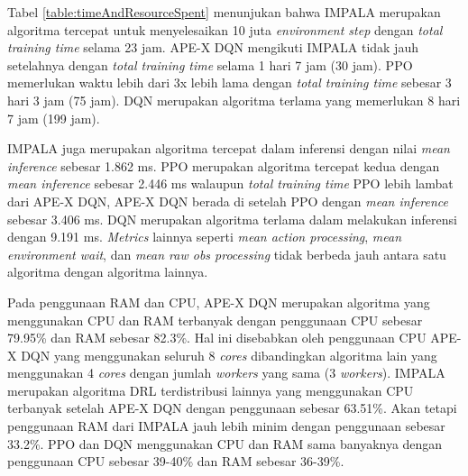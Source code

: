 Tabel \ref{table:timeAndResourceSpent} menunjukan bahwa IMPALA merupakan algoritma tercepat
untuk menyelesaikan 10 juta \emph{environment step} dengan \emph{total training time} selama
23 jam. APE-X DQN mengikuti IMPALA tidak jauh setelahnya dengan \emph{total training time}
selama 1 hari 7 jam (30 jam). PPO memerlukan waktu lebih dari 3x lebih lama dengan \emph{total training time}
sebesar 3 hari 3 jam (75 jam). DQN merupakan algoritma terlama yang memerlukan 8 hari 7 jam (199 jam).

IMPALA juga merupakan algoritma tercepat dalam inferensi dengan nilai \emph{mean inference} sebesar
1.862 ms. PPO merupakan algoritma tercepat kedua dengan \emph{mean inference} sebesar 2.446 ms walaupun \emph{total
training time} PPO lebih lambat dari APE-X DQN, APE-X DQN berada di setelah PPO dengan \emph{mean inference}
sebesar 3.406 ms. DQN merupakan algoritma terlama dalam melakukan inferensi dengan 9.191 ms.
\emph{Metrics} lainnya seperti \emph{mean action processing}, \emph{mean environment wait}, dan \emph{mean raw obs processing}
tidak berbeda jauh antara satu algoritma dengan algoritma lainnya.

Pada penggunaan RAM dan CPU, APE-X DQN merupakan algoritma yang menggunakan CPU dan RAM terbanyak
dengan penggunaan CPU sebesar 79.95\% dan RAM sebesar 82.3\%. Hal ini disebabkan oleh penggunaan CPU
APE-X DQN yang menggunakan seluruh 8 \emph{cores} dibandingkan algoritma lain yang menggunakan 4 \emph{cores}
dengan jumlah \emph{workers} yang sama (3 \emph{workers}). IMPALA merupakan algoritma DRL
terdistribusi lainnya yang menggunakan CPU terbanyak setelah APE-X DQN dengan penggunaan sebesar
63.51\%. Akan tetapi penggunaan RAM dari IMPALA jauh lebih minim dengan penggunaan sebesar 33.2\%.
PPO dan DQN menggunakan CPU dan RAM sama banyaknya dengan penggunaan CPU sebesar 39-40\% dan RAM
sebesar 36-39\%.